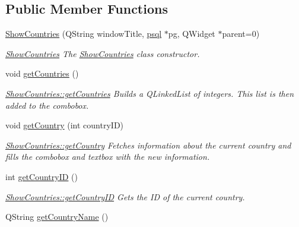 \subsection*{Public Member Functions}
\begin{DoxyCompactItemize}
\item 
\mbox{\hyperlink{class_show_countries_a509e0b6ebeb2fb580e7985b81b3f77e6}{Show\+Countries}} (Q\+String window\+Title, \mbox{\hyperlink{classpsql}{psql}} $\ast$pg, Q\+Widget $\ast$parent=0)
\begin{DoxyCompactList}\small\item\em \mbox{\hyperlink{class_show_countries}{Show\+Countries}} The \mbox{\hyperlink{class_show_countries}{Show\+Countries}} class constructor. \end{DoxyCompactList}\item 
\mbox{\label{class_show_countries_a93e4a320155473e2af80476f5a4648a3}} 
void \mbox{\hyperlink{class_show_countries_a93e4a320155473e2af80476f5a4648a3}{get\+Countries}} ()
\begin{DoxyCompactList}\small\item\em \mbox{\hyperlink{class_show_countries_a93e4a320155473e2af80476f5a4648a3}{Show\+Countries\+::get\+Countries}} Builds a Q\+Linked\+List of integers. This list is then added to the combobox. \end{DoxyCompactList}\item 
void \mbox{\hyperlink{class_show_countries_a5f39325688b0e71fa613d5b33810ce02}{get\+Country}} (int country\+ID)
\begin{DoxyCompactList}\small\item\em \mbox{\hyperlink{class_show_countries_a5f39325688b0e71fa613d5b33810ce02}{Show\+Countries\+::get\+Country}} Fetches information about the current country and fills the combobox and textbox with the new information. \end{DoxyCompactList}\item 
int \mbox{\hyperlink{class_show_countries_a02956713871e89645487500f3c9b77b8}{get\+Country\+ID}} ()
\begin{DoxyCompactList}\small\item\em \mbox{\hyperlink{class_show_countries_a02956713871e89645487500f3c9b77b8}{Show\+Countries\+::get\+Country\+ID}} Gets the ID of the current country. \end{DoxyCompactList}\item 
Q\+String \mbox{\hyperlink{class_show_countries_afc6d5f6817bd4c9388aef3d52d09d768}{get\+Country\+Name}} ()

\end{DoxyCompactItemize}

